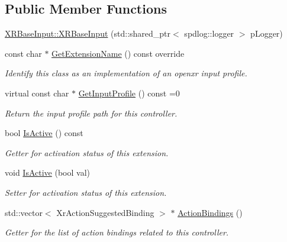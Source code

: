 \subsection*{Public Member Functions}
\begin{DoxyCompactItemize}
\item 
\mbox{\hyperlink{class_open_x_r_provider_1_1_x_r_base_input_aefe33721d76a923f485480f9df30c694}{X\+R\+Base\+Input\+::\+X\+R\+Base\+Input}} (std\+::shared\+\_\+ptr$<$ spdlog\+::logger $>$ p\+Logger)
\item 
const char $\ast$ \mbox{\hyperlink{class_open_x_r_provider_1_1_x_r_base_input_a139c33cb927e7b85970d66d35f76e154}{Get\+Extension\+Name}} () const override
\begin{DoxyCompactList}\small\item\em Identify this class as an implementation of an openxr input profile. \end{DoxyCompactList}\item 
virtual const char $\ast$ \mbox{\hyperlink{class_open_x_r_provider_1_1_x_r_base_input_ad12f6bf197b668bce45a6993de4728b5}{Get\+Input\+Profile}} () const =0
\begin{DoxyCompactList}\small\item\em Return the input profile path for this controller. \end{DoxyCompactList}\item 
bool \mbox{\hyperlink{class_open_x_r_provider_1_1_x_r_base_input_a1b727a927d0d5a32628e6b8749fa24d5}{Is\+Active}} () const
\begin{DoxyCompactList}\small\item\em Getter for activation status of this extension. \end{DoxyCompactList}\item 
void \mbox{\hyperlink{class_open_x_r_provider_1_1_x_r_base_input_a0b6bf061caadb5b5199869ab8904e513}{Is\+Active}} (bool val)
\begin{DoxyCompactList}\small\item\em Setter for activation status of this extension. \end{DoxyCompactList}\item 
std\+::vector$<$ Xr\+Action\+Suggested\+Binding $>$ $\ast$ \mbox{\hyperlink{class_open_x_r_provider_1_1_x_r_base_input_a34ca74de38cbd5ebd6cfc6372518a104}{Action\+Bindings}} ()
\begin{DoxyCompactList}\small\item\em Getter for the list of action bindings related to this controller. \end{DoxyCompactList}\end{DoxyCompactItemize}
